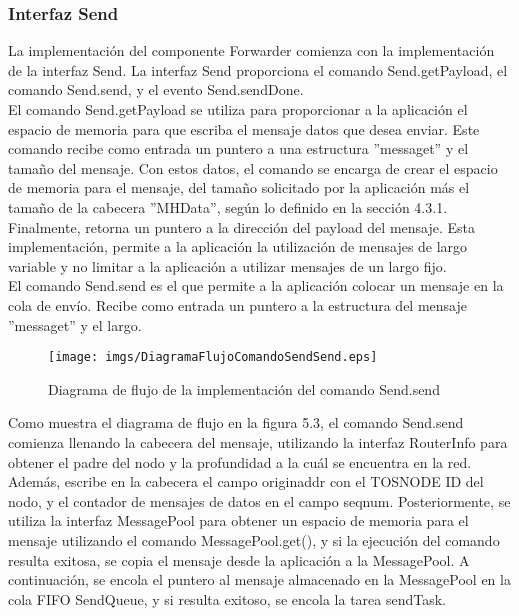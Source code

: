 \subsubsection{Interfaz Send}
La implementación del componente Forwarder comienza con la implementación de la interfaz Send. La interfaz Send proporciona el comando Send.getPayload, el comando Send.send, y el evento Send.sendDone.\\

El comando Send.getPayload se utiliza para proporcionar a la aplicación el espacio de memoria para que escriba el mensaje datos que desea enviar. Este comando recibe como entrada un puntero a una estructura ''message\textunderscore t''  y el tamaño del mensaje. Con estos datos, el comando se encarga de crear el espacio de memoria para el mensaje, del tamaño solicitado por la aplicación más el tamaño de la cabecera  ''MHData'', según lo definido en la sección 4.3.1. Finalmente, retorna un puntero a la dirección del payload del mensaje. Esta implementación, permite a la aplicación la utilización de mensajes de largo variable y no limitar a la aplicación a utilizar mensajes de un largo fijo.\\

El comando Send.send es el que permite a la aplicación colocar un mensaje en la cola de envío. Recibe como entrada un puntero a la estructura del mensaje ''message\textunderscore t'' y el largo. 

\begin{figure}[H]
	\centering
 	\texttt{[image: imgs/DiagramaFlujoComandoSendSend.eps]} 
 	\caption{Diagrama de flujo de la implementación del comando Send.send}
\end{figure}

Como muestra el diagrama de flujo en la figura 5.3, el comando Send.send comienza llenando la cabecera del mensaje, utilizando la interfaz RouterInfo para obtener el padre del nodo y la profundidad a la cuál se encuentra en la red. Además, escribe en la cabecera  el campo originaddr con el TOS\textunderscore NODE \textunderscore ID del nodo, y el contador de mensajes de datos en el campo seqnum. Posteriormente, se utiliza la interfaz MessagePool para obtener un espacio de memoria para el mensaje utilizando el comando MessagePool.get(), y si la ejecución del comando resulta exitosa, se copia el mensaje desde la aplicación a la MessagePool. A continuación, se encola el puntero al mensaje almacenado en la MessagePool en la cola FIFO SendQueue, y si resulta exitoso, se encola la tarea sendTask.\\

